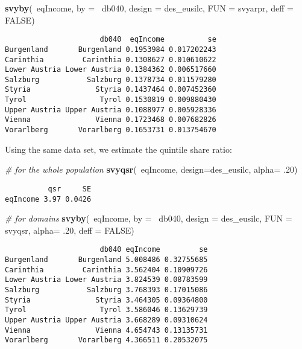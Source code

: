 \documentclass[]{book}
\newenvironment{Shaded}{\begin{snugshade}}{\end{snugshade}}
\newcommand{\KeywordTok}[1]{\textcolor[rgb]{0.13,0.29,0.53}{\textbf{{#1}}}}
\newcommand{\DataTypeTok}[1]{\textcolor[rgb]{0.13,0.29,0.53}{{#1}}}
\newcommand{\DecValTok}[1]{\textcolor[rgb]{0.00,0.00,0.81}{{#1}}}
\newcommand{\CommentTok}[1]{\textcolor[rgb]{0.56,0.35,0.01}{\textit{{#1}}}}
\newcommand{\OtherTok}[1]{\textcolor[rgb]{0.56,0.35,0.01}{{#1}}}
\newcommand{\NormalTok}[1]{{#1}}
\theoremstyle{definition}
\theoremstyle{definition}
\theoremstyle{remark}
\begin{document}
\begin{Shaded}
\begin{Highlighting}[]
\KeywordTok{svyby}\NormalTok{(~eqIncome, }\DataTypeTok{by =} \NormalTok{~db040, }\DataTypeTok{design =} \NormalTok{des_eusilc, }\DataTypeTok{FUN =} \NormalTok{svyarpr, }\DataTypeTok{deff =} \OtherTok{FALSE}\NormalTok{)}
\end{Highlighting}
\end{Shaded}

\begin{verbatim}
                      db040  eqIncome          se
Burgenland       Burgenland 0.1953984 0.017202243
Carinthia         Carinthia 0.1308627 0.010610622
Lower Austria Lower Austria 0.1384362 0.006517660
Salzburg           Salzburg 0.1378734 0.011579280
Styria               Styria 0.1437464 0.007452360
Tyrol                 Tyrol 0.1530819 0.009880430
Upper Austria Upper Austria 0.1088977 0.005928336
Vienna               Vienna 0.1723468 0.007682826
Vorarlberg       Vorarlberg 0.1653731 0.013754670
\end{verbatim}

Using the same data set, we estimate the quintile share ratio:

\begin{Shaded}
\begin{Highlighting}[]
\CommentTok{# for the whole population}
\KeywordTok{svyqsr}\NormalTok{(~eqIncome, }\DataTypeTok{design=}\NormalTok{des_eusilc, }\DataTypeTok{alpha=} \NormalTok{.}\DecValTok{20}\NormalTok{)}
\end{Highlighting}
\end{Shaded}

\begin{verbatim}
          qsr     SE
eqIncome 3.97 0.0426
\end{verbatim}

\begin{Shaded}
\begin{Highlighting}[]
\CommentTok{# for domains}
\KeywordTok{svyby}\NormalTok{(~eqIncome, }\DataTypeTok{by =} \NormalTok{~db040, }\DataTypeTok{design =} \NormalTok{des_eusilc,}
  \DataTypeTok{FUN =} \NormalTok{svyqsr, }\DataTypeTok{alpha=} \NormalTok{.}\DecValTok{20}\NormalTok{, }\DataTypeTok{deff =} \OtherTok{FALSE}\NormalTok{)}
\end{Highlighting}
\end{Shaded}

\begin{verbatim}
                      db040 eqIncome         se
Burgenland       Burgenland 5.008486 0.32755685
Carinthia         Carinthia 3.562404 0.10909726
Lower Austria Lower Austria 3.824539 0.08783599
Salzburg           Salzburg 3.768393 0.17015086
Styria               Styria 3.464305 0.09364800
Tyrol                 Tyrol 3.586046 0.13629739
Upper Austria Upper Austria 3.668289 0.09310624
Vienna               Vienna 4.654743 0.13135731
Vorarlberg       Vorarlberg 4.366511 0.20532075
\end{verbatim}
\end{document}
